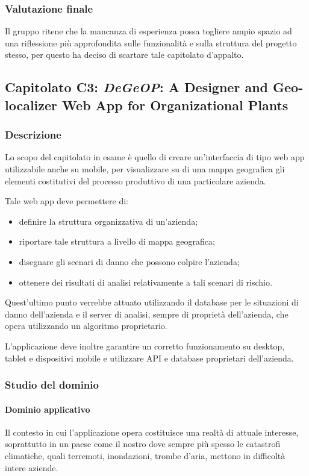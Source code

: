 		\subsubsection{Valutazione finale}
		Il gruppo ritene che la mancanza di esperienza possa togliere ampio spazio ad una riflessione più approfondita sulle funzionalità e sulla 
		struttura del progetto stesso, per questo ha deciso di scartare tale capitolato d'appalto.
		
	\subsection{Capitolato C3: \emph{DeGeOP}: A Designer and Geo-localizer Web App for Organizational Plants}
		\subsubsection{Descrizione}
		Lo scopo del capitolato in esame è quello di creare un'interfaccia di tipo web app utilizzabile anche su mobile, per visualizzare su di una 
		mappa geografica gli elementi costitutivi del processo produttivo di una particolare azienda.

		Tale web app deve permettere di:
		\begin{itemize}
			\item definire la struttura organizzativa di un'azienda;
			\item riportare tale struttura a livello di mappa geografica;
			\item disegnare gli scenari di danno che possono colpire l'azienda;
			\item ottenere dei risultati di analisi relativamente a tali scenari di rischio.
		\end{itemize}
		Quest'ultimo punto verrebbe attuato utilizzando il database per le situazioni di danno dell'azienda e il server di analisi, sempre di proprietà dell'azienda,
		che opera utilizzando un algoritmo proprietario.

		L'applicazione deve inoltre garantire un corretto funzionamento su desktop, tablet e dispositivi mobile e utilizzare API e database proprietari dell'azienda.
		\subsubsection{Studio del dominio}
			\paragraph{Dominio applicativo}
			Il contesto in cui l'applicazione opera costituisce una realtà di attuale interesse, soprattutto in un paese come il nostro dove sempre più spesso le catastrofi climatiche, quali terremoti, inondazioni, trombe d'aria, mettono in difficoltà intere aziende.

